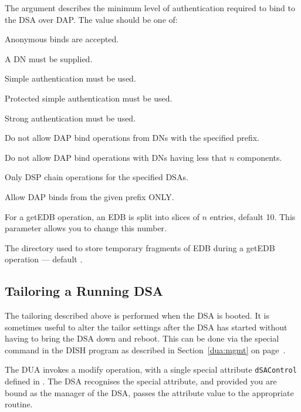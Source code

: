 \begin{describe}
\item [\verb"authentication":]
The argument describes the minimum level of authentication required to
bind to the DSA over DAP.  The value should be one of:
\begin{describe}
\item [\verb"none":]	Anonymous binds are accepted.
\item [\verb"dn":]	A DN must be supplied.
\item [\verb"simple":]	Simple authentication must be used.
\item [\verb"protected":]	Protected simple authentication must
be used.
\item [\verb"strong":]  Strong authentication must be used.
\end{describe}
\item [\verb"reject\_prefix":]	Do not allow DAP bind operations from
DNs with the specified prefix.
\item [\verb"reject\_length":]   Do not allow DAP bind operations with
DNs having less that $n$ components.
\item [\verb"relay\_for":]	Only DSP chain operations for the
specified DSAs.
\item [\verb"accept\_prefix":]	Allow DAP binds from the given prefix ONLY.
\item [\verb"getedb\_size":]	For a getEDB operation, an EDB is
split into slices of $n$ entries, default 10.  This parameter allows
you to change this number.
\item [\verb"edbtmp\_path":]	The directory used to store temporary
fragments of EDB during a getEDB operation --- default .

\end{describe}

\subsection {Tailoring a Running DSA}
\label{dsa:mgmt}

The tailoring described above is performed when the DSA is
booted.  It is sometimes useful to alter the tailor settings
after the DSA has started without having to bring
the DSA down and reboot.  This can be done via
the  special  command in the DISH program
as described in Section~\ref{dua:mgmt} on page~\pageref{dua:mgmt}.

The DUA invokes a modify operation, with a
single special attribute \verb+dSAControl+ defined in \cite{QUIPU.Design}.
The DSA recognises the special attribute, and provided you are
bound as the manager of the DSA, passes the attribute value to the
appropriate routine.



